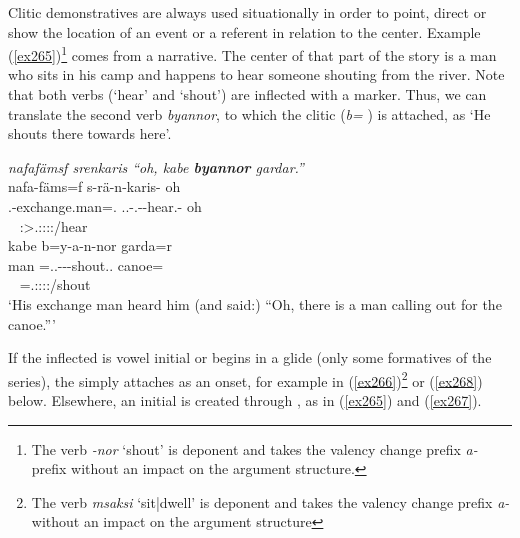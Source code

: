 Clitic demonstratives are always used situationally in order to point, direct or show the location of an event or a referent in relation to the  center. Example (\ref{ex265})\footnote{The verb \emph{-nor} `shout' is deponent and takes the valency change prefix \emph{a-} prefix without an impact on the argument structure.} comes from a narrative. The  center of that part of the story is a man who sits in his camp and happens to hear someone shouting from the river. Note that both verbs (`hear' and `shout') are inflected with a  marker. Thus, we can translate the second verb \emph{byannor}, to which the  clitic  (\emph{b=} \Med) is attached, as `He shouts there towards here'.

\begin{exe}
	\ex \emph{nafafämsf srenkaris ``oh, kabe \textbf{byannor} gardar.''}\\
	\glll nafa-fäms=f s-rä-n-karis-\Zero{} oh\\
	\Third.\Poss-exchange.man=\Erg.\Sg{} \Tsg.\Masc.\Bet-\Irr.\Ndu-\Venit-hear.\Rs-\Stsg{} oh\\
	~ {\Stsg:\Sbj>\Tsg.\Masc:\Obj:\Irr:\Pfv:\Venit/hear} ~\\
	\sn
	\glll kabe b=y-a-n-nor garda=r\\
	man \Med=\Tsg.\Masc.\Alph-\Vc-\Venit-shout.\Ext.\Ndu{} canoe=\Purp{}\\
	~ {\Med=\Tsg.\Masc:\Sbj:\Nonpast:\Ipfv:\Venit/shout} ~\\
	\trans `His exchange man heard him (and said:) ``Oh, there is a man calling out for the canoe.''' 
	\label{ex265}
\end{exe}

If the inflected  is vowel initial or begins in a glide (only some formatives of the \Alph{} series), the   simply attaches as an onset, for example in (\ref{ex266})\footnote{The verb \emph{msaksi} `sit|dwell' is deponent and takes the valency change prefix \emph{a-} without an impact on the argument structure} or (\ref{ex268}) below. Elsewhere, an initial  is created through , as in (\ref{ex265}) and (\ref{ex267}).

